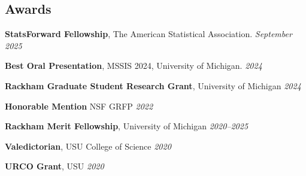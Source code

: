 \documentclass[11pt]{article}
\newenvironment {reflist}
                {
                 \begin{list}{}
                 {\setlength{\labelwidth}{0mm}
                  \setlength{\leftmargin}{8mm}
                  \setlength{\itemindent}{-3mm}
                  \setlength{\labelsep}{0mm}
                  \setlength{\parsep}{0.1 ex}
                  \setlength{\itemsep}{0.1cm}
      \setlength{\topsep}{0.15cm}}} %
   {\end{list}}
\begin{document}
\begin{reflist}

\end{reflist}

\subsection*{Awards}

\noindent\hspace{5mm}\textbf{StatsForward Fellowship}, The American Statistical Association. \hfill{\textit{September 2025}}

\vspace{2mm}
\noindent\hspace{5mm}\textbf{Best Oral Presentation}, MSSIS 2024, University of Michigan. \hfill {\textit{2024}}

\hspace{5mm}{\it Award amount: $\$200$}


\vspace{2mm}
\noindent\hspace{5mm}\textbf{Rackham Graduate Student Research Grant}, University of Michigan \hfill {\textit{2024}}

\hspace{5mm}{\it Award amount: $\$2500$}

\vspace{2mm}
\noindent\hspace{5mm}\textbf{Honorable Mention} NSF GRFP \hfill {\textit{2022}}

\vspace{2mm}
\noindent\hspace{5mm}\textbf{Rackham Merit Fellowship}, University of Michigan \hfill {\textit{2020--2025}}

\hspace{5mm}{\it Award amount: Three years of PhD student funding.}

\vspace{2mm}
\noindent\hspace{5mm}\textbf{Valedictorian}, USU College of Science \hfill {\textit{2020}}

\vspace{2mm}
\noindent\hspace{5mm}\textbf{URCO Grant}, USU \hfill  {\textit{2020}}
\end{document}
